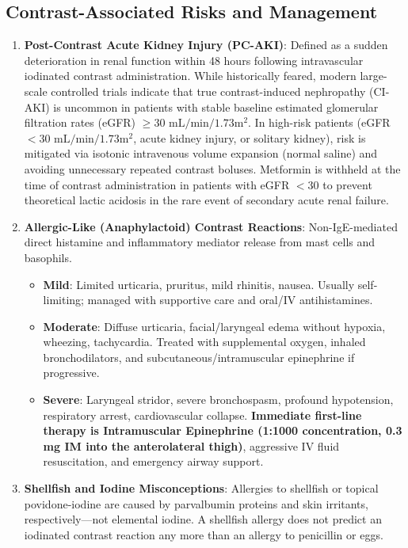 \documentclass[11pt,a4paper]{article}
\begin{document}
\subsection{Contrast-Associated Risks and Management}
\begin{enumerate}[leftmargin=*]
    \item \textbf{Post-Contrast Acute Kidney Injury (PC-AKI)}: Defined as a sudden deterioration in renal function within 48 hours following intravascular iodinated contrast administration. While historically feared, modern large-scale controlled trials indicate that true contrast-induced nephropathy (CI-AKI) is uncommon in patients with stable baseline estimated glomerular filtration rates (eGFR) $\ge 30\text{ mL/min}/1.73\text{m}^2$. In high-risk patients (eGFR $<30\text{ mL/min}/1.73\text{m}^2$, acute kidney injury, or solitary kidney), risk is mitigated via isotonic intravenous volume expansion (normal saline) and avoiding unnecessary repeated contrast boluses. Metformin is withheld at the time of contrast administration in patients with eGFR $<30$ to prevent theoretical lactic acidosis in the rare event of secondary acute renal failure.
    \item \textbf{Allergic-Like (Anaphylactoid) Contrast Reactions}: Non-IgE-mediated direct histamine and inflammatory mediator release from mast cells and basophils.
    \begin{itemize}
        \item \textbf{Mild}: Limited urticaria, pruritus, mild rhinitis, nausea. Usually self-limiting; managed with supportive care and oral/IV antihistamines.
        \item \textbf{Moderate}: Diffuse urticaria, facial/laryngeal edema without hypoxia, wheezing, tachycardia. Treated with supplemental oxygen, inhaled bronchodilators, and subcutaneous/intramuscular epinephrine if progressive.
        \item \textbf{Severe}: Laryngeal stridor, severe bronchospasm, profound hypotension, respiratory arrest, cardiovascular collapse. \textbf{Immediate first-line therapy is Intramuscular Epinephrine (1:1000 concentration, 0.3\,mg IM into the anterolateral thigh)}, aggressive IV fluid resuscitation, and emergency airway support.
    \end{itemize}
    \item \textbf{Shellfish and Iodine Misconceptions}: Allergies to shellfish or topical povidone-iodine are caused by parvalbumin proteins and skin irritants, respectively—not elemental iodine. A shellfish allergy does not predict an iodinated contrast reaction any more than an allergy to penicillin or eggs.
\end{enumerate}
\end{document}

